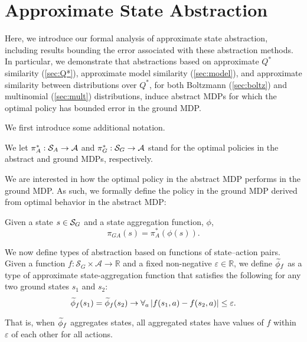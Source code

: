 \section{Approximate State Abstraction}

\label{sec:theory_results}
Here, we introduce our formal analysis of approximate state abstraction, including results bounding the error associated with these abstraction methods. In particular, we demonstrate that abstractions based on approximate $Q^*$ similarity (\ref{sec:Q*}), approximate model similarity (\ref{sec:model}), and approximate similarity between distributions over $Q^*$, for both Boltzmann (\ref{sec:boltz}) and multinomial (\ref{sec:mult}) distributions, induce abstract \acp{MDP} for which the optimal policy has bounded error in the ground MDP.

We first introduce some additional notation.

We let $\pi_A^* : \mathcal{S}_A \rightarrow \mathcal{A}$ and $\pi_G^* : \mathcal{S}_G \rightarrow \mathcal{A}$ stand for the optimal policies in the abstract and ground \acp{MDP}, respectively.
\edefn

We are interested in how the optimal policy in the abstract \ac{MDP} performs in the ground \ac{MDP}. As such, we formally define the policy in the ground \ac{MDP} derived from optimal behavior in the abstract \ac{MDP}:

Given a state $s \in \mathcal{S}_G$ and a state aggregation function, $\phi$, 
\begin{equation}
\pi_{GA}(s)=\pi_A^*(\phi(s)).
\end{equation}
\edefn

We now define types of abstraction based on functions of state--action pairs.
Given a function $f: \mathcal{S}_G \times \mathcal{A} \rightarrow \mathbb{R}$ and a fixed non-negative $\varepsilon \in \mathbb{R}$, we define $\widetilde \phi_f$ as a type of approximate state-aggregation function that satisfies the following for any two ground states $s_1$ and $s_2$: 
\begin{equation}
\label{eq:phi_f}
\widetilde \phi_f(s_1) = \widetilde \phi_f(s_2) \rightarrow \forall_a \left|f(s_1, a) - f(s_2, a)\right| \leq \varepsilon.
\end{equation}
\edefn

That is, when $\widetilde \phi_f$ aggregates states, all aggregated states have values of $f$ within $\varepsilon$ of each other for all actions.

